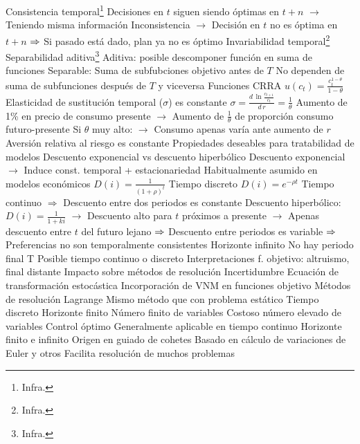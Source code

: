 \documentclass{nuevotema}
\begin{document}
\begin{esquemal}
				\4 Consistencia temporal\footnote{Infra.}
				\4[] Decisiones en $t$ siguen siendo óptimas en $t+n$
				\4[] $\to$ Teniendo misma información
				\4[] Inconsistencia
				\4[] $\to$ Decisión en $t$ no es óptima en $t+n$
				\4[] $\Rightarrow$ Si pasado está dado, plan ya no es óptimo
				\4 Invariabilidad temporal\footnote{Infra.}
				\4 Separabilidad aditiva\footnote{Infra.}
				\4[] Aditiva:
				\4[] posible descomponer función en suma de funciones
				\4[] Separable:
				\4[] Suma de subfubciones objetivo antes de $T$
				\4[] No dependen de suma de subfunciones después de $T$
				\4[] y viceversa
				\4 Funciones CRRA
				\4[] $u(c_t) = \frac{c_t^{1-\theta}}{1-\theta}$
				\4[] Elasticidad de sustitución temporal ($\sigma$) es constante
				\4[] $\sigma = \frac{d \, \ln \frac{c_{t+1}}{c_t} }{d \,r} = \frac{1}{\theta}$
				\4[] Aumento de 1\% en precio de consumo presente
				\4[] $\to$ Aumento de $\frac{1}{\theta}$ de proporción consumo futuro-presente
				\4[] Si $\theta$ muy alto:
				\4[] $\to$ Consumo apenas varía ante aumento de $r$
				\4[] Aversión relativa al riesgo es constante
				\4[] Propiedades deseables para tratabilidad de modelos
				\4 Descuento exponencial vs descuento hiperbólico
				\4[] Descuento exponencial
				\4[] $\to$ Induce const. temporal + estacionariedad
				\4[] Habitualmente asumido en modelos económicos
				\4[] $D(i) = \frac{1}{(1+\rho)^t}$ Tiempo discreto
				\4[] $D(i) = e^{-\rho t}$ Tiempo continuo
				\4[] $\Rightarrow$ Descuento entre dos periodos es constante
				\4[] Descuento hiperbólico:
				\4[] $D(i) = \frac{1}{1+ki}$
				\4[] $\to$ Descuento alto para $t$ próximos a presente
				\4[] $\to$ Apenas descuento entre $t$ del futuro lejano
				\4[] $\Rightarrow$ Descuento entre periodos es variable
				\4[] $\Rightarrow$ Preferencias no son temporalmente consistentes
			\3 Horizonte infinito
				\4 No hay periodo final T
				\4 Posible tiempo continuo o discreto
				\4 Interpretaciones f. objetivo: altruismo, final distante
				\4 Impacto sobre métodos de resolución
			\3 Incertidumbre
				\4 Ecuación de transformación estocástica
				\4 Incorporación de VNM en funciones objetivo
		\2 Métodos de resolución
			\3 Lagrange
				\4 Mismo método que con problema estático
				\4 Tiempo discreto
				\4 Horizonte finito
				\4 Número finito de variables
				\4 Costoso número elevado de variables
			\3 Control óptimo
				\4 Generalmente aplicable en tiempo continuo
				\4 Horizonte finito e infinito
				\4 Origen en guiado de cohetes
				\4[] Basado en cálculo de variaciones de Euler y otros
				\4 Facilita resolución de muchos problemas

\end{esquemal}
\end{document}
